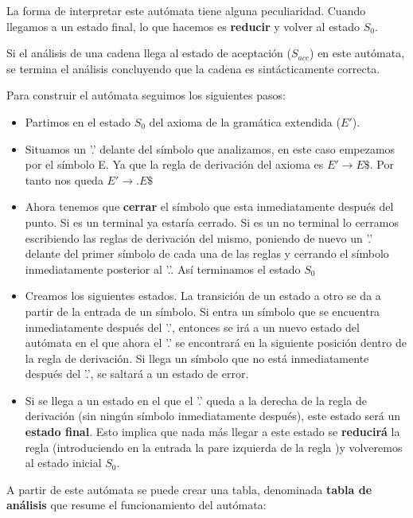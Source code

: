 \documentclass{apuntes}
\begin{document}
\begin{example}
La forma de interpretar este autómata tiene alguna peculiaridad. Cuando llegamos a un estado final, lo que hacemos es \textbf{reducir} y volver al estado $S_0$.

Si el análisis de una cadena llega al estado de aceptación ($S_{acc}$) en este autómata, se termina el análisis concluyendo que la cadena es sintácticamente correcta.

Para construir el autómata seguimos los siguientes pasos:
\begin{itemize}
\item Partimos en el estado $S_0$ del axioma de la gramática extendida ($E'$). 
\item Situamos un '.' delante del símbolo que analizamos, en este caso empezamos por el símbolo E. Ya que la regla de derivación del axioma es $E' \rightarrow E\$$. Por tanto nos queda $E' \rightarrow .E\$$
\item Ahora tenemos que \textbf{cerrar} el símbolo que esta inmediatamente después del punto. Si es un terminal ya estaría cerrado. Si es un no terminal lo cerramos escribiendo las reglas de derivación del mismo, poniendo de nuevo un '.' delante del primer símbolo de cada una de las reglas y cerrando el símbolo inmediatamente posterior al '.'. Así terminamos el estado $S_0$
\item Creamos los siguientes estados. La transición de un estado a otro se da a partir de la entrada de un símbolo. Si entra un símbolo que se encuentra inmediatamente después del '.', entonces se irá a un nuevo estado del autómata en el que ahora el '.' se encontrará en la siguiente posición dentro de la regla de derivación. Si llega un símbolo que no está inmediatamente después del '.', se saltará a un estado de error.
\item Si se llega a un estado en el que el '.' queda a la derecha de la regla de derivación (sin ningún símbolo inmediatamente después), este estado será un \textbf{estado final}. Esto implica que nada más llegar a este estado se \textbf{reducirá} la regla (introduciendo en la entrada la pare izquierda de la regla )y volveremos al estado inicial $S_0$.
\end{itemize}

A partir de este autómata se puede crear una tabla, denominada \textbf{tabla de análisis} que resume el funcionamiento del autómata:


\end{example}
\end{document}
